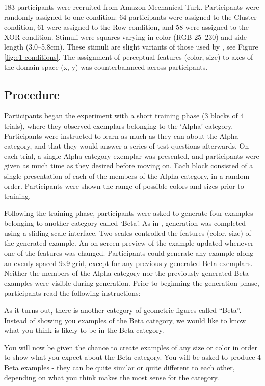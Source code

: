 \documentclass[12pt]{article}
\begin{document}
\begin{flushleft}
183 participants were recruited from Amazon Mechanical Turk. Participants were randomly assigned to one condition: 64 participants were assigned to the Cluster condition, 61 were assigned to the Row condition, and 58 were assigned to the XOR condition. Stimuli were squares varying in color (RGB 25--230) and side length (3.0--5.8cm). These stimuli are slight variants of those used by \cite{conaway2016similar}, see Figure \ref{fig:e1-conditions}. The assignment of perceptual features (color, size) to axes of the domain space (x, y) was counterbalanced across participants.

\subsection{Procedure}

Participants began the experiment with a short training phase (3 blocks of 4 trials), where they observed exemplars belonging to the `Alpha' category. Participants were instructed to learn as much as they can about the Alpha category, and that they would answer a series of test questions afterwards. On each trial, a single Alpha category exemplar was presented, and participants were given as much time as they desired before moving on. Each block consisted of a single presentation of each of the members of the Alpha category, in a random order. Participants were shown the range of possible colors and sizes prior to training.

Following the training phase, participants were asked to generate four examples belonging to another category called `Beta'. As in \citet{jern2013probabilistic}, generation was completed using a sliding-scale interface. Two scales controlled the features (color, size) of the generated example. An on-screen preview of the example updated whenever one of the features was changed. Participants could generate any example along an evenly-spaced 9x9 grid, except for any previously generated Beta exemplars. Neither the members of the Alpha category nor the previously generated Beta examples were visible during generation. Prior to beginning the generation phase, participants read the following instructions:

\begin{displayquote}
As it turns out, there is another category of geometric figures called ``Beta''. Instead of showing you examples of the Beta category, we would like to know what you think is likely to be in the Beta category. 

You will now be given the chance to create examples of any size or color in order to show what you expect about the Beta category. You will be asked to produce 4 Beta examples - they can be quite similar or quite different to each other, depending on what you think makes the most sense for the category.


\end{displayquote}
\end{flushleft}
\end{document}
